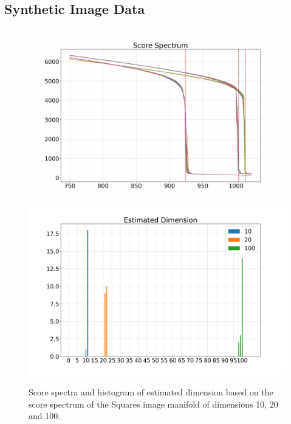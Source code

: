    
   \subsection{Synthetic Image Data}
   \label{ch3:appendix:additional_image}
   
   \begin{figure}[H]
   \centering
   \begin{minipage}[t]{.45\textwidth}
       \centering
       \includegraphics[width=.95\textwidth]{chapter3/figures/image_manifolds/squares_spectrum.jpg}\\
       \includegraphics[width=.95\textwidth]{chapter3/figures/image_manifolds/squares_spectrum_adhoc.png}
       \caption{Score spectra and histogram of estimated dimension based on the score spectrum of the Squares image manifold of dimensions 10, 20 and 100.}
       \label{ch3:fig:squares_spectrum}
   \end{minipage}
   \hspace{10mm}

\end{figure}
